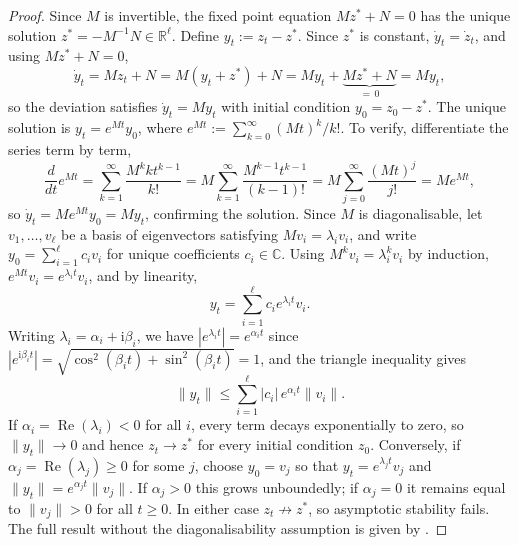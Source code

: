 \begin{description}[
    style=unboxed,
    leftmargin=0pt,
    labelindent=0pt,
    labelsep=0.5em
]
\begin{proof}
Since $M$ is invertible, the fixed point equation $Mz^* + N = 0$ has
the unique solution $z^* = -M^{-1}N \in \mathbb{R}^{\ell}$. Define
$y_t := z_t - z^*$. Since $z^*$ is constant, $\dot{y}_t = \dot{z}_t$,
and using $Mz^* + N = 0$,
\[
    \dot{y}_t = Mz_t + N = M(y_t + z^*) + N
    = My_t + \underbrace{Mz^* + N}_{=\,0} = My_t,
\]
so the deviation satisfies $\dot{y}_t = My_t$ with initial condition
$y_0 = z_0 - z^*$. The unique solution is $y_t = e^{Mt}y_0$, where
$e^{Mt} := \sum_{k=0}^{\infty}(Mt)^k/k!$. To verify, differentiate
the series term by term,
\[
    \frac{d}{dt}e^{Mt}
    = \sum_{k=1}^{\infty}\frac{M^k k t^{k-1}}{k!}
    = M\sum_{k=1}^{\infty}\frac{M^{k-1}t^{k-1}}{(k-1)!}
    = M\sum_{j=0}^{\infty}\frac{(Mt)^j}{j!}
    = Me^{Mt},
\]
so $\dot{y}_t = Me^{Mt}y_0 = My_t$, confirming the solution. Since $M$
is diagonalisable, let $v_1,\ldots,v_\ell$ be a basis of eigenvectors
satisfying $Mv_i = \lambda_i v_i$, and write $y_0 = \sum_{i=1}^{\ell}
c_i v_i$ for unique coefficients $c_i \in \mathbb{C}$. Using
$M^k v_i = \lambda_i^k v_i$ by induction, $e^{Mt}v_i = e^{\lambda_i t}v_i$,
and by linearity,
\[
    y_t = \sum_{i=1}^{\ell} c_i e^{\lambda_i t} v_i.
\]
Writing $\lambda_i = \alpha_i + \mathrm{i}\beta_i$, we have
$|e^{\lambda_i t}| = e^{\alpha_i t}$ since $|e^{\mathrm{i}\beta_i t}|
= \sqrt{\cos^2(\beta_i t) + \sin^2(\beta_i t)} = 1$, and the triangle
inequality gives
\[
    \|y_t\| \leq \sum_{i=1}^{\ell} |c_i|\,e^{\alpha_i t}\|v_i\|.
\]
If $\alpha_i=\operatorname{Re}(\lambda_i) < 0$ for all $i$, every term decays
exponentially to zero, so $\|y_t\| \to 0$ and hence $z_t \to z^*$ for
every initial condition $z_0$. Conversely, if
$\alpha_j=\operatorname{Re}(\lambda_j) \geq 0$ for some $j$, choose $y_0 = v_j$
so that $y_t = e^{\lambda_j t}v_j$ and
$\|y_t\| = e^{\alpha_j t}\|v_j\|$. If $\alpha_j > 0$ this grows
unboundedly; if $\alpha_j = 0$ it remains equal to $\|v_j\| > 0$ for
all $t \geq 0$. In either case $z_t \not\to z^*$, so asymptotic
stability fails. The full result without the diagonalisability
assumption is given by \citet[Theorem~4.5]{Khalil2002}.
\end{proof}



\end{description}
